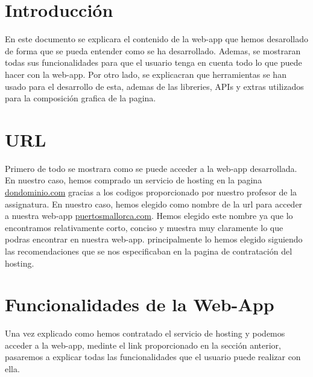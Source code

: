 \documentclass{article}
\begin{document}
\section{Introducción}
En este documento se explicara el contenido de la web-app que hemos desarollado de forma que se pueda entender como se ha desarrollado. Ademas, se mostraran todas sus funcionalidades para que el usuario tenga en cuenta todo lo que puede hacer con la web-app. Por otro lado, se explicacran que herramientas se han usado para el desarrollo de esta, ademas de las libreries, APIs y extras utilizados para la composición grafica de la pagina.

\section{URL}
Primero de todo se mostrara como se puede acceder a la web-app desarrollada. En nuestro caso, hemos comprado un servicio de hosting en la pagina \href{https://www.dondominio.com/es/}{dondominio.com} gracias a los codigos proporcionado por nuestro profesor de la assignatura. En nuestro caso, hemos elegido como nombre de la url para acceder a nuestra web-app \href{http://www.puertosmallorca.com/}{puertosmallorca.com}. Hemos elegido este nombre ya que lo encontramos relativamente corto, conciso y muestra muy claramente lo que podras encontrar en nuestra web-app. principalmente lo hemos elegido siguiendo las recomendaciones que se nos especificaban en la pagina de contratación del hosting.

\section{Funcionalidades de la Web-App}
Una vez explicado como hemos contratado el servicio de hosting y podemos acceder a la web-app, medinte el link proporcionado en la sección anterior, pasaremos a explicar todas las funcionalidades que el usuario puede realizar con ella.
\end{document}
